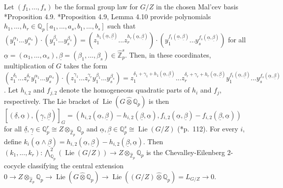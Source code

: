\documentclass[11pt]{amsart}
\theoremstyle{definition}
\numberwithin{equation}{section}
\numberwithin{equation}{section}
\newcommand\QQ{\mathbb{Q}}
\newcommand\ZZ{\mathbb{Z}}
\DeclareMathOperator{\Lie}{Lie}
\begin{document}
Let $(f_1,...,f_s)$ be the formal group law for $G/Z$ in the chosen Mal'cev basis \cite{Hu-Wang-continuou-Malcev-completion}*{Proposition 4.9}. \cite{Hu-Wang-continuou-Malcev-completion}*{Proposition 4.9, Lemma 4.10} provide polynomials $h_1,...,h_r\in \QQ_p[a_1,...,a_s,b_1,...,b_s]$ such that $(y_1^{\alpha_1}...y_s^{\alpha_s})\cdot (y_1^{\beta_1}...y_s^{\beta_s})=(z_1^{h_1(\underline{\alpha},\underline{\beta})}...z_r^{h_r(\underline{\alpha},\underline{\beta})})\cdot (y_1^{f_1(\underline{\alpha},\underline{\beta})}...y_s^{f_s(\underline{\alpha},\underline{\beta})})$ for all $\underline{\alpha}=(\alpha_1,...,\alpha_s),\underline{\beta}=(\beta_1,...,\beta_s)\in \widehat{\ZZ}_p^s$. Then, in these coordinates, multiplication of $G$ takes the form $(z_1^{\delta_1}...z_r^{\delta_r}y_1^{\alpha_1}...y_s^{\alpha_s})\cdot (z_1^{\gamma_1}...z_r^{\gamma_r}y_1^{\beta_1}...y_s^{\beta_s})=z_1^{\delta_1+\gamma_1+h_1(\underline{\alpha},\underline{\beta})}...z_r^{\delta_r+\gamma_r+h_r(\underline{\alpha},\underline{\beta})}y_1^{f_1(\underline{\alpha},\underline{\beta})}...y_s^{f_s(\underline{\alpha},\underline{\beta})}$. Let $h_{i,2}$ and $f_{j,2}$ denote the homogeneous quadratic parts of $h_i$ and $f_j$, respectively. The Lie bracket of $\Lie(G\widehat{\otimes}\QQ_p)$ is then $[(\underline{\delta},\underline{\alpha}),(\underline{\gamma},\underline{\beta})]_G=(h_{i,2}(\underline{\alpha},\underline{\beta})-h_{i,2}(\underline{\beta},\underline{\alpha}),f_{i,2}(\underline{\alpha},\underline{\beta})-f_{i,2}(\underline{\beta},\underline{\alpha}))$ for all $\underline{\delta},\underline{\gamma}\in \QQ_p^r\cong Z\otimes_{\widehat{\ZZ}_p}\QQ_p$ and $\underline{\alpha},\underline{\beta}\in \QQ_p^s\cong \Lie(G/Z)$ (\cite{Serre-Lie-algebra-Lie-group}*{p.~112}). For every $i$, define $k_i(\underline{\alpha}\wedge \underline{\beta})=h_{i,2}(\underline{\alpha},\underline{\beta})-h_{i,2}(\underline{\beta},\underline{\alpha})$. Then $(k_1,...,k_r):\bigwedge^2_{\QQ_p}(\Lie(G/Z))\rightarrow Z\otimes_{\widehat{\ZZ}_p}\QQ_p$ is the Chevalley-Eilenberg $2$-cocycle classifying the central extension $0\rightarrow Z\otimes_{\widehat{\ZZ}_p}\QQ_p \rightarrow \Lie(G\widehat{\otimes}\QQ_p)\rightarrow\Lie((G/Z)\widehat{\otimes}\QQ_p)=L_{G/Z}\rightarrow 0$.
\end{document}
